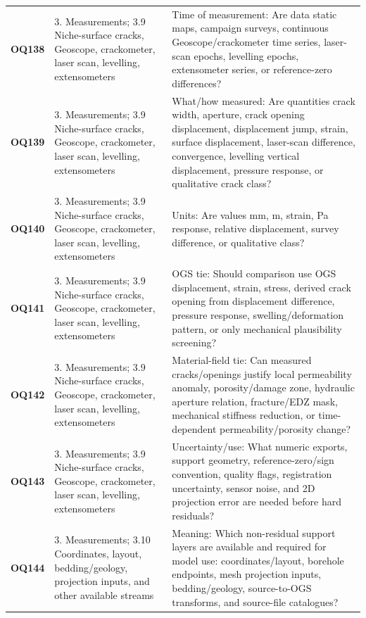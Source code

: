 \begin{longtable}{@{}L{0.10\textwidth} L{0.23\textwidth} L{0.59\textwidth}@{}}
\addlinespace[0.16em]
\textbf{OQ138} & 3. Measurements; 3.9 Niche-surface cracks, Geoscope, crackometer, laser scan, levelling, extensometers & Time of measurement: Are data static maps, campaign surveys, continuous Geoscope/crackometer time series, laser-scan epochs, levelling epochs, extensometer series, or reference-zero differences?\\
\addlinespace[0.16em]
\textbf{OQ139} & 3. Measurements; 3.9 Niche-surface cracks, Geoscope, crackometer, laser scan, levelling, extensometers & What/how measured: Are quantities crack width, aperture, crack opening displacement, displacement jump, strain, surface displacement, laser-scan difference, convergence, levelling vertical displacement, pressure response, or qualitative crack class?\\
\addlinespace[0.16em]
\textbf{OQ140} & 3. Measurements; 3.9 Niche-surface cracks, Geoscope, crackometer, laser scan, levelling, extensometers & Units: Are values mm, m, strain, Pa response, relative displacement, survey difference, or qualitative class?\\
\addlinespace[0.16em]
\textbf{OQ141} & 3. Measurements; 3.9 Niche-surface cracks, Geoscope, crackometer, laser scan, levelling, extensometers & OGS tie: Should comparison use OGS displacement, strain, stress, derived crack opening from displacement difference, pressure response, swelling/deformation pattern, or only mechanical plausibility screening?\\
\addlinespace[0.16em]
\textbf{OQ142} & 3. Measurements; 3.9 Niche-surface cracks, Geoscope, crackometer, laser scan, levelling, extensometers & Material-field tie: Can measured cracks/openings justify local permeability anomaly, porosity/damage zone, hydraulic aperture relation, fracture/EDZ mask, mechanical stiffness reduction, or time-dependent permeability/porosity change?\\
\addlinespace[0.16em]
\textbf{OQ143} & 3. Measurements; 3.9 Niche-surface cracks, Geoscope, crackometer, laser scan, levelling, extensometers & Uncertainty/use: What numeric exports, support geometry, reference-zero/sign convention, quality flags, registration uncertainty, sensor noise, and 2D projection error are needed before hard residuals?\\
\addlinespace[0.16em]
\textbf{OQ144} & 3. Measurements; 3.10 Coordinates, layout, bedding/geology, projection inputs, and other available streams & Meaning: Which non-residual support layers are available and required for model use: coordinates/layout, borehole endpoints, mesh projection inputs, bedding/geology, source-to-OGS transforms, and source-file catalogues?\\

\end{longtable}
